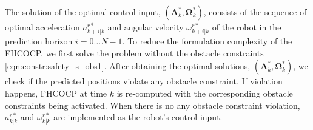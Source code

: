 \documentclass[journal]{IEEEtran}
\begin{document}
    The solution of the optimal control input, $(\mathbf{A}^*_k,\mathbf{\Omega}^*_k)$, consists of the sequence of optimal acceleration $a^{r*}_{k+i|k}$ and angular velocity $\omega^{r*}_{k+i|k}$ of the robot in the prediction horizon $i = 0 \dots N-1$. To reduce the formulation complexity of the FHCOCP, we first solve the problem without the obstacle constraints \cref{eqn:constr:safety_s_obs1}. After obtaining the optimal solutions, $(\mathbf{A}^*_k,\mathbf{\Omega}^*_k)$, we check if the predicted positions violate any obstacle constraint. If violation happens, FHCOCP at time $k$ is re-computed with the corresponding obstacle constraints being activated. When there is no any obstacle constraint violation, $a^{r*}_{k|k}$ and $\omega^{r*}_{k|k}$ are implemented as the robot's control input. 
\end{document}
